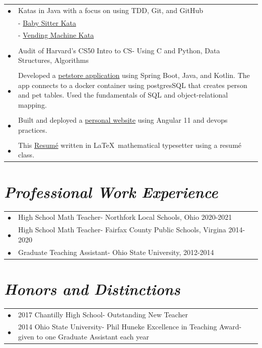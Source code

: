 \documentclass{res}
\begin{document}
\begin{resume}
\begin{tabular}{p{0\linewidth}p{\linewidth}}
$\bullet$ &  Katas in Java with a focus on using TDD, Git, and GitHub \\
&-\,\,\href{https://github.com/smudgegame/Baby-Sitter-Kata}{Baby Sitter Kata}\\
&-\,\,\href{https://github.com/smudgegame/Better-Vending-Machine}{Vending Machine Kata}\\
&\\
$\bullet$ & Audit of Harvard's CS50 Intro to CS-  Using C and Python, Data Structures, Algorithms\\
&\\
$\bullet$ & Developed a \href{https://github.com/smudgegame/petstore}{petstore application} using Spring Boot, Java, and Kotlin. The app connects to a docker container using postgresSQL that creates person and pet tables. Used the fundamentals of SQL and object-relational mapping. \\
&\\
$\bullet$ & Built and deployed a \href{https://github.com/smudgegame/amwebsite}{personal website} using Angular 11 and devops practices. \\
&\\
$\bullet$ & This \href{https://github.com/smudgegame/amresume}{Resum\'e} written in \LaTeX \, mathematical typesetter using a resum\'e class. 
\end{tabular}




\section{\sl \bf Professional Work Experience}
\begin{tabular}{p{0\linewidth}p{\linewidth}}
$\bullet$ &High School Math Teacher-\,\,Northfork Local Schools, Ohio 2020-2021\\
$\bullet$&High School Math Teacher-\,\,Fairfax County Public Schools, Virgina 2014-2020\\
$\bullet$&Graduate Teaching Assistant-\,\,Ohio State University, 2012-2014\\
\end{tabular}

\section{\sl  \bf Honors and Distinctions}
\begin{tabular}{p{0\linewidth}p{\linewidth}}
$\bullet$&2017 Chantilly High School- Outstanding New Teacher\\
$\bullet$&2014 Ohio State University- Phil Huneke Excellence in Teaching Award-  given to one Graduate Assistant each year\\
\end{tabular}



\end{resume}

\vfill 
\end{document}
